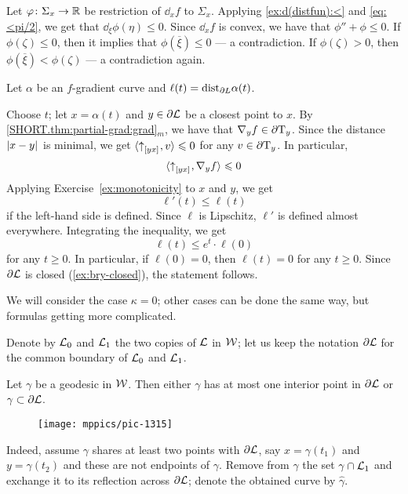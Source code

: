 Let $\varphi\colon\Sigma_x\to\mathbb{R}$ be restriction of $\dd_xf$ to $\Sigma_x$.
Applying \ref{ex:d(distfun):<} and \ref{eq:<pi/2}, we get that $\dd_\xi\phi(\eta)\le 0$.
Since $\dd_xf$ is convex, we have that $\phi''+\phi\le 0$.
If $\phi(\zeta)\le 0$, then it implies that $\phi(\overline{\xi})\le 0$ --- a contradiction.
If $\phi(\zeta)> 0$, then $\phi(\overline{\xi})<\phi(\zeta)$ --- a contradiction again.

Let $\alpha$ be an $f$-gradient curve and $\ell(t)=\mathrm{dist}_{\partial L}\alpha(t)$.

Choose $t$;
let $x=\alpha(t)$ and $y\in \partial\mathcal{L}$ be a closest point to $x$.
By \ref{SHORT.thm:partial-grad:grad}$_m$, we have that $\nabla_y f\in\partial \mathrm{T}_y$.
Since the distance $\dist{x}{y}{}$ is minimal, 
we get $\langle {\uparrow}_{[{y}{x}]_{{}}},v\rangle\leqslant 0$ for any $v\in \partial \mathrm{T}_y$.
In particular,
\[\langle {\uparrow}_{[{y}{x}]_{{}}},\nabla_y f\rangle\leqslant 0\]
Applying Exercise~\ref{ex:monotonicity} to $x$ and $y$, 
we get
\[\ell'(t)\le \ell(t)\]
if the left-hand side is defined.
Since $\ell$ is Lipschitz, $\ell'$ is defined almost everywhere.
Integrating the inequality, we get 
\[\ell(t)\le e^t\cdot\ell(0)\]
for any $t\ge 0$.
In particular, if $\ell(0)=0$, then $\ell(t)=0$ for any $t\ge 0$.
Since $\partial\mathcal{L}$ is closed (\ref{ex:bry-closed}), the statement follows.

We will consider the case $\kappa=0$;
other cases can be done the same way, but formulas getting more complicated.

Denote by $\mathcal{L}_0$ and $\mathcal{L}_1$ the two copies of $\mathcal{L}$ in $\mathcal{W}$;
let us keep the notation $\partial \mathcal{L}$ for the common boundary of $\mathcal{L}_0$ and $\mathcal{L}_1$.

\begin{clm}{}
Let $\gamma$ be a geodesic in $\mathcal{W}$.
Then either $\gamma$ has at most one interior point in $\partial \mathcal{L}$ or
$\gamma\subset \partial \mathcal{L}$.
\end{clm}

\begin{wrapfigure}{r}{45mm}
\vskip-2mm
\centering
\texttt{[image: mppics/pic-1315]}
\end{wrapfigure}

Indeed, assume $\gamma$ shares at least two points with $\partial \mathcal{L}$, say $x=\gamma(t_1)$ and $y=\gamma(t_2)$ and these are not endpoints of $\gamma$.
Remove from $\gamma$ the set $\gamma\cap \mathcal{L}_1$
and exchange it to its reflection across $\partial\mathcal{L}$;
denote the obtained curve by $\hat\gamma$.

